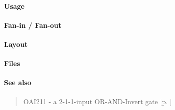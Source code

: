 \paragraph{Usage}

\paragraph{Fan-in / Fan-out}

\paragraph{Layout}

\paragraph{Files}

\paragraph{See also}
\begin{quote}
    OAI211 - a 2-1-1-input OR-AND-Invert gate [p. \pageref{OAI211}] \\
\end{quote}
